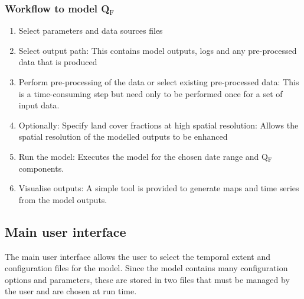 \documentclass[letterpaper,10pt,english]{sphinxmanual}
\begin{document}
\subsubsection{Workflow to model Q$_{\text{F}}$}
\label{\detokenize{OtherManuals/GQF_Manual:workflow-to-model-qf}}\begin{enumerate}
\item {} 
Select parameters and data sources files

\item {} 
Select output path: This contains model outputs, logs and any
pre-processed data that is produced

\item {} 
Perform pre-processing of the data or select existing pre-processed
data: This is a time-consuming step but need only to be performed
once for a set of input data.

\item {} 
Optionally: Specify land cover fractions at high spatial resolution:
Allows the spatial resolution of the modelled outputs to be enhanced

\item {} 
Run the model: Executes the model for the chosen date range and
Q$_{\text{F}}$ components.

\item {} 
Visualise outputs: A simple tool is provided to generate maps and
time series from the model outputs.

\end{enumerate}


\subsection{Main user interface}
\label{\detokenize{OtherManuals/GQF_Manual:main-user-interface}}
The main user interface allows the user to select the temporal extent
and configuration files for the model. Since the model contains many
configuration options and parameters, these are stored in two files that
must be managed by the user and are chosen at run time.
\end{document}
